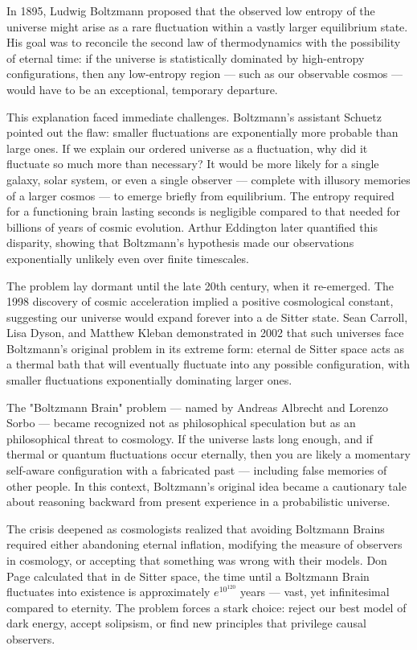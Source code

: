 \begin{historical}
In 1895, Ludwig Boltzmann proposed that the observed low entropy of the universe might arise as a rare fluctuation within a vastly larger equilibrium state. His goal was to reconcile the second law of thermodynamics with the possibility of eternal time: if the universe is statistically dominated by high-entropy configurations, then any low-entropy region — such as our observable cosmos — would have to be an exceptional, temporary departure.

This explanation faced immediate challenges. Boltzmann's assistant Schuetz pointed out the flaw: smaller fluctuations are exponentially more probable than large ones. If we explain our ordered universe as a fluctuation, why did it fluctuate so much more than necessary? It would be more likely for a single galaxy, solar system, or even a single observer — complete with illusory memories of a larger cosmos — to emerge briefly from equilibrium. The entropy required for a functioning brain lasting seconds is negligible compared to that needed for billions of years of cosmic evolution. Arthur Eddington later quantified this disparity, showing that Boltzmann's hypothesis made our observations exponentially unlikely even over finite timescales.

The problem lay dormant until the late 20th century, when it re-emerged. The 1998 discovery of cosmic acceleration implied a positive cosmological constant, suggesting our universe would expand forever into a de Sitter state. Sean Carroll, Lisa Dyson, and Matthew Kleban demonstrated in 2002 that such universes face Boltzmann's original problem in its extreme form: eternal de Sitter space acts as a thermal bath that will eventually fluctuate into any possible configuration, with smaller fluctuations exponentially dominating larger ones.

The "Boltzmann Brain" problem — named by Andreas Albrecht and Lorenzo Sorbo — became recognized not as philosophical speculation but as an philosophical threat to cosmology. If the universe lasts long enough, and if thermal or quantum fluctuations occur eternally, then you are likely a momentary self-aware configuration with a fabricated past — including false memories of other people. In this context, Boltzmann’s original idea became a cautionary tale about reasoning backward from present experience in a probabilistic universe.

The crisis deepened as cosmologists realized that avoiding Boltzmann Brains required either abandoning eternal inflation, modifying the measure of observers in cosmology, or accepting that something was wrong with their models. Don Page calculated that in de Sitter space, the time until a Boltzmann Brain fluctuates into existence is approximately $e^{10^{120}}$ years — vast, yet infinitesimal compared to eternity. The problem forces a stark choice: reject our best model of dark energy, accept solipsism, or find new principles that privilege causal observers.


\end{historical}
